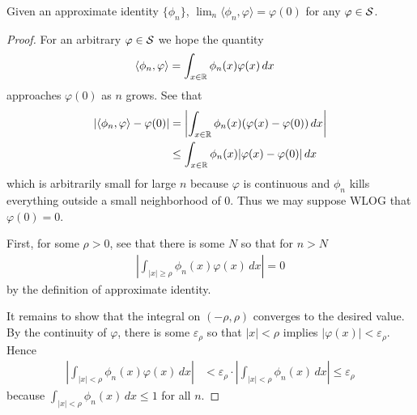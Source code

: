     \begin{thm}
      \label{thm:approxid}
      Given an approximate identity $\{\phi_n\}$, $\lim_n\langle \phi_n,\varphi\rangle = \varphi(0)$ for any $\varphi\in\S$.
    \end{thm}
    \begin{proof}
      For an arbitrary $\varphi\in\S$ we hope the quantity
      \begin{align*}
        \langle\phi_n,\varphi\rangle 
        &=\int_{x\in\R} \phi_n(x)\varphi(x)\,dx
      \end{align*}
      approaches $\varphi(0)$ as $n$ grows.
      See that
      \begin{align*}
        |\langle\phi_n,\varphi\rangle - \varphi(0)|
        &=\left| \int_{x\in\R} \phi_n(x)(\varphi(x)-\varphi(0))\,dx \right|
        \\&\le \int_{x\in\R} \phi_n(x)|\varphi(x)-\varphi(0)|\,dx
      \end{align*}
      which is arbitrarily small for large $n$ because $\varphi$ is continuous and $\phi_n$ kills everything outside a small neighborhood of 0.
      Thus we may suppose WLOG that $\varphi(0)=0$.

      First, for some $\rho>0$, see that there is some $N$ so that for $n>N$
      \begin{align*}
        \left| \int_{|x|\ge\rho} \phi_n(x)\varphi(x)\,dx \right|
        = 0
      \end{align*}
      by the definition of approximate identity.

      It remains to show that the integral on $(-\rho,\rho)$ converges to the desired value.
      By the continuity of $\varphi$, there is some $\varepsilon_\rho$ so that $|x|<\rho$ implies $|\varphi(x)|<\varepsilon_\rho$.
      Hence
      \begin{align*}
        \left| \int_{|x|<\rho} \phi_n(x)\varphi(x)\,dx \right|
        &< \varepsilon_\rho\cdot \left| \int_{|x|<\rho} \phi_n(x)\,dx \right|
        \le \varepsilon_\rho
      \end{align*}
      because $\int_{|x|<\rho} \phi_n(x)\,dx \le 1$ for all $n$.


\end{proof}
